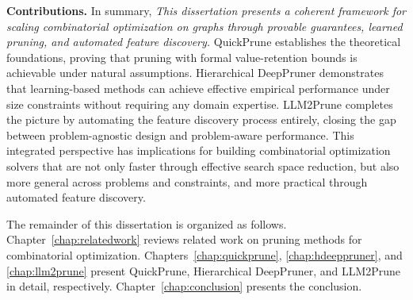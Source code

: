 \textbf{Contributions.} In summary, \emph{This dissertation presents a coherent framework for scaling combinatorial optimization
on graphs through provable guarantees, learned pruning, and automated feature discovery.} QuickPrune establishes the theoretical foundations, proving that pruning with
formal value-retention bounds is achievable under natural assumptions. Hierarchical DeepPruner demonstrates that learning-based methods can achieve effective empirical
performance under size constraints without requiring any domain expertise. LLM2Prune
completes the picture by automating the feature discovery process entirely, closing the
gap between problem-agnostic design and problem-aware performance. This integrated
perspective has implications for building combinatorial optimization solvers that are
not only faster through effective search space reduction, but also more general across
problems and constraints, and more practical through automated feature discovery.

The remainder of this dissertation is organized as follows. Chapter~\ref{chap:relatedwork} reviews related work
on pruning methods for combinatorial optimization. Chapters~\ref{chap:quickprune}, \ref{chap:hdeeppruner}, and \ref{chap:llm2prune} present
QuickPrune, Hierarchical DeepPruner, and LLM2Prune in detail, respectively. Chapter~\ref{chap:conclusion}
presents the conclusion.
